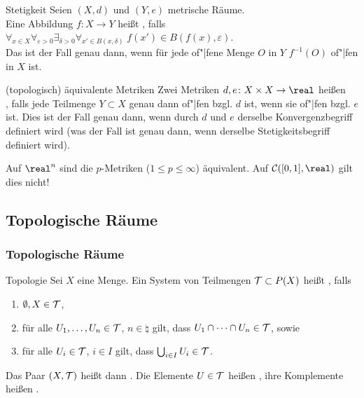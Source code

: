 \begin{Def}{Stetigkeit}
    Seien $(X, d)$ und $(Y, e)$ metrische Räume. \\
    Eine Abbildung $f\colon X \rightarrow Y$ heißt , falls
    $\forall_{x \in X} \forall_{\varepsilon > 0} \exists_{\delta > 0}
    \forall_{x' \in B(x, \delta)}\; f(x') \in B(f(x), \varepsilon)$. \\
    Das ist der Fall genau dann, wenn für jede of"|fene Menge $O$ in $Y$
    $f^{-1}(O)$ of"|fen in $X$ ist.
\end{Def}

\linie

\begin{Def}{(topologisch) äquivalente Metriken}
    Zwei Metriken $d, e\colon X \times X \rightarrow \real$ heißen \\
    , falls jede Teilmenge $Y \subset X$
    genau dann of"|fen bzgl. $d$ ist, wenn sie of"|fen bzgl. $e$ ist.
    Dies ist der Fall genau dann, wenn durch $d$ und $e$ derselbe
    Konvergenzbegriff definiert wird
    (was der Fall ist genau dann, wenn derselbe Stetigkeitsbegriff
    definiert wird).
\end{Def}

\begin{Bsp}
    Auf $\real^n$ sind die $p$-Metriken ($1 \le p \le \infty$) äquivalent.
    Auf $\C([0,1], \real)$ gilt dies nicht!
\end{Bsp}

\pagebreak

\subsection{%
    Topologische Räume%
}

\subsubsection{%
    Topologische Räume%
}

\begin{Def}{Topologie}
    Sei $X$ eine Menge.
    Ein System von Teilmengen $\mathcal{T} \subset P(X)$ heißt ,
    falls
    \begin{enumerate}[label=(O\arabic*)]
        \item
        $\emptyset, X \in \mathcal{T}$,
        
        \item
        für alle $U_1, \dotsc, U_n \in \mathcal{T}$, $n \in \natural$ gilt, dass
        $U_1 \cap \dotsb \cap U_n \in \mathcal{T}$, sowie
        
        \item
        für alle $U_i \in \mathcal{T}$, $i \in I$ gilt, dass
        $\bigcup_{i \in I} U_i \in \mathcal{T}$.
    \end{enumerate}
    Das Paar $(X, \mathcal{T})$ heißt dann .
    Die Elemente $U \in \mathcal{T}$ heißen ,
    ihre Komplemente heißen .
\end{Def}

